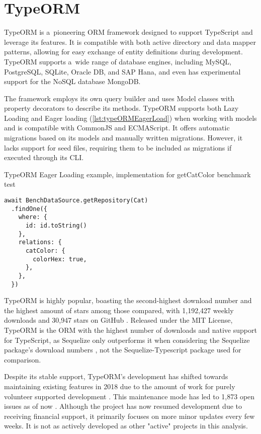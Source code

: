 \section{TypeORM}

TypeORM is a~pioneering ORM framework designed to support TypeScript and
leverage its features. It is compatible with both active directory and data
mapper patterns, allowing for easy exchange of entity definitions during
development. TypeORM supports a~wide range of database engines, including MySQL,
PostgreSQL, SQLite, Oracle DB, and SAP Hana, and even has experimental support
for the NoSQL database MongoDB.

The framework employs its own query builder and uses Model classes with property
decorators to describe its methods. TypeORM supports both Lazy Loading and Eager
loading (\autoref{lst:typeORMEagerLoad}) when working with models and is compatible
with CommonJS and ECMAScript. It offers automatic migrations based on its models
and manually written migrations. However, it lacks support for seed files,
requiring them to be included as migrations if executed through its CLI.

\begin{listing}[hb]
  \caption{TypeORM Eager Loading example, implementation for getCatColor benchmark test}
  \label{lst:typeORMEagerLoad}
  \vspace{-0.5\baselineskip}
  \begin{verbatim}
await BenchDataSource.getRepository(Cat)
  .findOne({
    where: { 
      id: id.toString() 
    },
    relations: {
      catColor: {
        colorHex: true,
      },
    },
  })
  \end{verbatim}
  \vspace{-0.5\baselineskip}
\end{listing}

TypeORM is highly popular, boasting the second-highest download number and the
highest amount of stars among those compared, with 1,192,427 weekly downloads
\cite{typeORMNpm} and 30,947 stars on GitHub \cite{typeORMGitHub}. Released
under the MIT License, TypeORM is the ORM with the highest number of downloads
and native support for TypeScript, as Sequelize only outperforms it when
considering the Sequelize package's download numbers
\cite{sequelizeNpm}, not the Sequelize-Typescript package
\cite{sequelizeTypescriptNpm} used for comparison.

Despite its stable support, TypeORM's development has shifted towards
maintaining existing features in 2018 due to the amount of work for purely
volunteer supported development \cite{typeORMGitHubFuture}. This maintenance
mode has led to 1,873 open issues as of now \cite{typeORMGitHub}. Although the
project has now resumed development due to receiving financial support, it
primarily focuses on more minor updates every few weeks. It is not as actively
developed as other "active" projects in this analysis.

